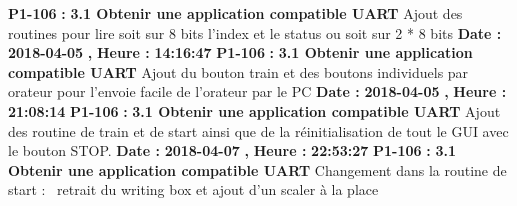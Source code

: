 \documentclass{article}%
\begin{document}
%
\textbf{P1{-}106 }%
\textbf{ : }%
\textbf{ 3.1 Obtenir une application compatible UART}%
\newline%
\newline%
%
Ajout des routines pour lire soit sur 8 bits l'index et le status ou soit sur 2 * 8 bits\newline%
\newline%
%
\textbf{Date : }%
\textbf{2018{-}04{-}05}%
\textbf{,}%
\textbf{ Heure : }%
\textbf{14:16:47}%
\newline%
%
\textbf{P1{-}106 }%
\textbf{ : }%
\textbf{ 3.1 Obtenir une application compatible UART}%
\newline%
\newline%
%
Ajout du bouton train et des boutons individuels par orateur pour l'envoie facile de l'orateur par le PC\newline%
\newline%
%
\textbf{Date : }%
\textbf{2018{-}04{-}05}%
\textbf{,}%
\textbf{ Heure : }%
\textbf{21:08:14}%
\newline%
%
\textbf{P1{-}106 }%
\textbf{ : }%
\textbf{ 3.1 Obtenir une application compatible UART}%
\newline%
\newline%
%
Ajout des routine de train et de start ainsi que de la réinitialisation de tout le GUI avec le bouton STOP.\newline%
\newline%
%
\textbf{Date : }%
\textbf{2018{-}04{-}07}%
\textbf{,}%
\textbf{ Heure : }%
\textbf{22:53:27}%
\newline%
%
\textbf{P1{-}106 }%
\textbf{ : }%
\textbf{ 3.1 Obtenir une application compatible UART}%
\newline%
\newline%
%
Changement dans la routine de start :~\newline%
retrait du writing box et ajout d'un scaler à la place\newline%
\newline%
%
\newpage

%
\end{document}
